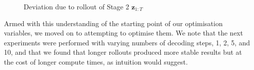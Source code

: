 \begin{figure}
    \centering
    \hfil
    \hfil
    \hfil
    \caption{Deviation due to rollout of Stage 2 $\mathbf{z}_{1:T}$}
    \label{fig:humor_stage_2_rollout_deviation}
\end{figure}

Armed with this understanding of the starting point of our optimisation variables, we moved on to attempting to optimise them. We note that the next experiments were performed with varying numbers of decoding steps, 1, 2, 5, and 10, and that we found that longer rollouts produced more stable results but at the cost of longer compute times, as intuition would suggest.


